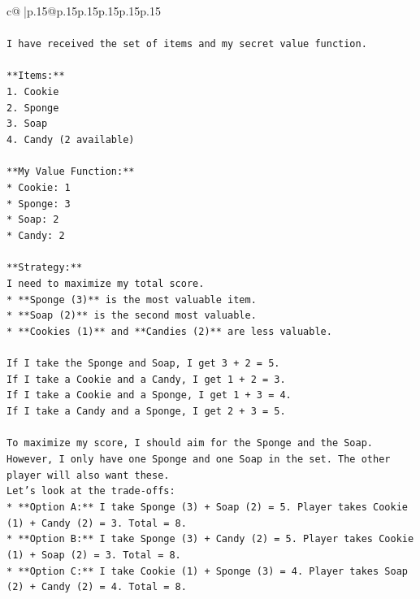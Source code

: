 \documentclass{article}
\begin{document}
{\begin{supertabular}{c@{$\;$}|p{.15\linewidth}@{}p{.15\linewidth}p{.15\linewidth}p{.15\linewidth}p{.15\linewidth}p{.15\linewidth}}
{{{\\ 
\\ 
\texttt{I have received the set of items and my secret value function.} \\
\\ 
\texttt{**Items:**} \\
\texttt{1. Cookie} \\
\texttt{2. Sponge} \\
\texttt{3. Soap} \\
\texttt{4. Candy (2 available)} \\
\\ 
\texttt{**My Value Function:**} \\
\texttt{*   Cookie: 1} \\
\texttt{*   Sponge: 3} \\
\texttt{*   Soap: 2} \\
\texttt{*   Candy: 2} \\
\\ 
\texttt{**Strategy:**} \\
\texttt{I need to maximize my total score.} \\
\texttt{*   **Sponge (3)** is the most valuable item.} \\
\texttt{*   **Soap (2)** is the second most valuable.} \\
\texttt{*   **Cookies (1)** and **Candies (2)** are less valuable.} \\
\\ 
\texttt{If I take the Sponge and Soap, I get 3 + 2 = 5.} \\
\texttt{If I take a Cookie and a Candy, I get 1 + 2 = 3.} \\
\texttt{If I take a Cookie and a Sponge, I get 1 + 3 = 4.} \\
\texttt{If I take a Candy and a Sponge, I get 2 + 3 = 5.} \\
\\ 
\texttt{To maximize my score, I should aim for the Sponge and the Soap. However, I only have one Sponge and one Soap in the set. The other player will also want these.} \\
\texttt{Let's look at the trade{-}offs:} \\
\texttt{*   **Option A:** I take Sponge (3) + Soap (2) = 5. Player takes Cookie (1) + Candy (2) = 3. Total = 8.} \\
\texttt{*   **Option B:** I take Sponge (3) + Candy (2) = 5. Player takes Cookie (1) + Soap (2) = 3. Total = 8.} \\
\texttt{*   **Option C:** I take Cookie (1) + Sponge (3) = 4. Player takes Soap (2) + Candy (2) = 4. Total = 8.} \\
}}}
\end{supertabular}}
\end{document}
